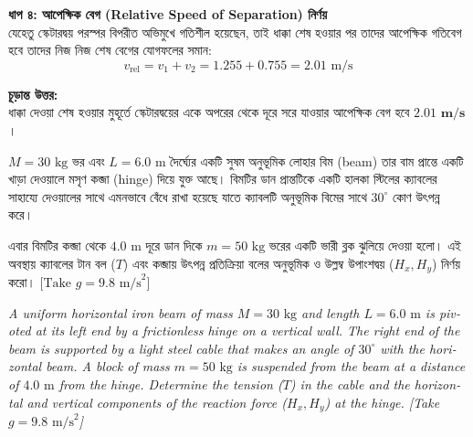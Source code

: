 \documentclass[12pt, a4paper]{article}
\begin{document}
\begin{tcolorbox}[solutionbox={সমাধান (Solution)}]
\vspace{0.5em}
\noindent
\textbf{ধাপ ৪: আপেক্ষিক বেগ (Relative Speed of Separation) নির্ণয়} \\
যেহেতু স্কেটারদ্বয় পরস্পর বিপরীত অভিমুখে গতিশীল হয়েছেন, তাই ধাক্কা শেষ হওয়ার পর তাদের আপেক্ষিক গতিবেগ হবে তাদের নিজ নিজ শেষ বেগের যোগফলের সমান:
$$v_{\text{rel}} = v_1 + v_2 = 1.255 + 0.755 = 2.01\text{ m/s}$$

\vspace{1em}
\begin{tcolorbox}[answerbox]
\textbf{চূড়ান্ত উত্তর:} \\
ধাক্কা দেওয়া শেষ হওয়ার মুহূর্তে স্কেটারদ্বয়ের একে অপরের থেকে দূরে সরে যাওয়ার আপেক্ষিক বেগ হবে $\mathbf{2.01\text{ m/s}}$।
\end{tcolorbox}
\end{tcolorbox}
\begin{tcolorbox}[questionbox={প্রশ্ন (Question) 20}]
\noindent
$M = 30\text{ kg}$ ভর এবং $L = 6.0\text{ m}$ দৈর্ঘ্যের একটি সুষম অনুভূমিক লোহার বিম (beam) তার বাম প্রান্তে একটি খাড়া দেওয়ালে মসৃণ কব্জা (hinge) দিয়ে যুক্ত আছে। বিমটির ডান প্রান্তটিকে একটি হালকা স্টিলের ক্যাবলের সাহায্যে দেওয়ালের সাথে এমনভাবে বেঁধে রাখা হয়েছে যাতে ক্যাবলটি অনুভূমিক বিমের সাথে $30^\circ$ কোণ উৎপন্ন করে। 

\vspace{0.3em}
\noindent
এবার বিমটির কব্জা থেকে $4.0\text{ m}$ দূরে ডান দিকে $m = 50\text{ kg}$ ভরের একটি ভারী ব্লক ঝুলিয়ে দেওয়া হলো। এই অবস্থায় ক্যাবলের টান বল ($T$) এবং কব্জায় উৎপন্ন প্রতিক্রিয়া বলের অনুভূমিক ও উল্লম্ব উপাংশদ্বয় ($H_x, H_y$) নির্ণয় করো। [$\text{Take } g = 9.8\text{ m/s}^2$]

\vspace{0.8em}
\begin{english}
\noindent\textit{\color{darkgray}
A uniform horizontal iron beam of mass $M = 30\text{ kg}$ and length $L = 6.0\text{ m}$ is pivoted at its left end by a frictionless hinge on a vertical wall. The right end of the beam is supported by a light steel cable that makes an angle of $30^\circ$ with the horizontal beam. A block of mass $m = 50\text{ kg}$ is suspended from the beam at a distance of $4.0\text{ m}$ from the hinge. Determine the tension ($T$) in the cable and the horizontal and vertical components of the reaction force ($H_x, H_y$) at the hinge. [Take $g = 9.8\text{ m/s}^2$]
}
\end{english}
\end{tcolorbox}
\end{document}
